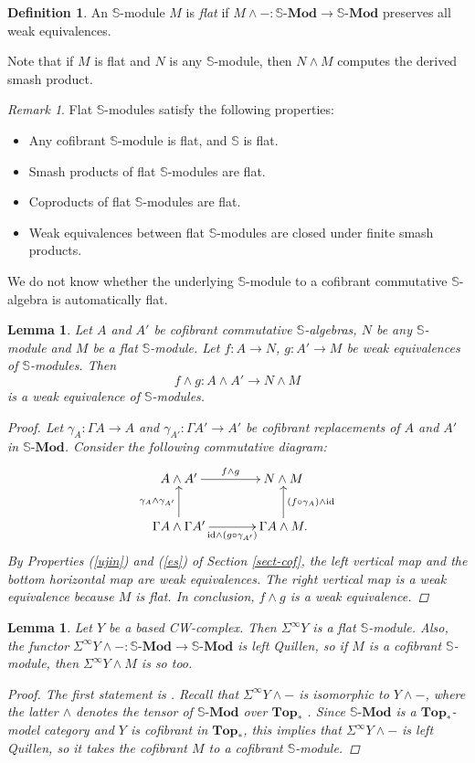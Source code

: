\documentclass[a4paper,11pt]{amsart} %
\theoremstyle{definition} \newtheorem{defn}[equation]{Definition}
\theoremstyle{remark} \newtheorem{notation}[equation]{Notation}
\theoremstyle{plain} \newtheorem{teo}[equation]{Theorem}
\theoremstyle{plain} \newtheorem{lema}[equation]{Lemma}
\theoremstyle{plain} \newtheorem{prop}[equation]{Proposition}
\theoremstyle{plain} \newtheorem{corolario}[equation]{Corollary}
\theoremstyle{remark} \newtheorem{obs}[equation]{Remark}
\theoremstyle{remark} \newtheorem{sideobs}[equation]{Side remark}
\theoremstyle{remark} \newtheorem{ejercicio}[equation]{Exercise}
\theoremstyle{definition} \newtheorem{notn}[equation]{Notation}
\theoremstyle{remark} \newtheorem{ej}[equation]{Example}
\theoremstyle{remark} \newtheorem{contraej}[equation]{Counterexample}
\theoremstyle{plain} \newtheorem{conj}[equation]{Conjecture}
\renewcommand{\1}{\ensuremath{\mathbbm{1}}}
\renewcommand{\S}{\mathbb{S}}
\newcommand{\bi}{\begin{itemize}}
\newcommand{\ei}{\end{itemize}}
\newcommand{\bdefn}{\begin{defn}}
\newcommand{\edefn}{\end{defn}}
\newcommand{\bprf}{\begin{proof}}
\newcommand{\eprf}{\end{proof}}
\newcommand{\bobs}{\begin{obs}}
\newcommand{\eobs}{\end{obs}}
\newcommand{\id}{\mathrm{id}}
\newcommand{\Mod}{\mbox{-}\mathbf{Mod}}
\newcommand{\SMod}{\ensuremath{\mathbb{S}}\mbox{-}\ensuremath{\textbf{Mod}}}
\newcommand{\Top}{\ensuremath{\mathbf{Top}}}
\numberwithin{equation}{section}
\begin{document}
%

%

%
%

\bdefn \label{def-flat}An $\S$-module $M$ is \emph{flat} if $M\wedge-:\SMod\to \SMod$ preserves all weak equivalences.
\edefn

Note that if $M$ is flat and $N$ is any $\S$-module, then $N\wedge M$ computes the derived smash product.


\bobs Flat $\S$-modules satisfy the following properties: \label{pseudo-rem} 
\bi 
\item Any cofibrant $\S$-module is flat, and $\S$ is flat.
\item Smash products of flat $\S$-modules are flat.
\item Coproducts of flat $\S$-modules are flat.
\item Weak equivalences between flat $\S$-modules are closed under finite smash products. %
%
\ei
We do not know whether the underlying $\S$-module to a cofibrant commutative $\S$-algebra is automatically flat.
\eobs

\begin{lema} \label{cofcofsemi} Let $A$ and $A'$ be cofibrant commutative $\S$-algebras, $N$ be any $\S$-module and $M$ be a flat $\S$-module. Let $f:A\to N$, $g:A'\to M$ be weak equivalences of $\S$-modules. Then 
\[f \wedge g : A \wedge A' \to N \wedge M\]
is a weak equivalence of $\S$-modules.
\bprf Let $\gamma_A:\Gamma A \to A$ and $\gamma_{A'}:\Gamma A' \to A'$ be cofibrant replacements of $A$ and $A'$ in $\SMod$. Consider the following commutative diagram:
\[\xymatrix@C+1pc{A \wedge A' \ar[r]^-{f \wedge g} & N \wedge M \\ \Gamma A \wedge \Gamma A' \ar[u]^-{\gamma_A \wedge \gamma_{A'}} \ar[r]_-{\id \wedge (g\circ \gamma_{A'})} & \Gamma A \wedge M. \ar[u]_-{(f\circ \gamma_A) \wedge \id} }\]
By Properties (\ref{ujin}) and (\ref{es}) of Section \ref{sect-cof}, the left vertical map and the bottom horizontal map are weak equivalences. The right vertical map is a weak equivalence because $M$ is flat. In conclusion, $f\wedge g$ is a weak equivalence.
\eprf
\end{lema}


\begin{lema} \label{isflat} Let $Y$ be a based CW-complex. Then $\Sigma^\infty Y$ is a flat $\S$-module. Also, the functor $\Sigma^\infty Y \wedge -:\S\Mod\to \S\Mod $ is left Quillen,  %
so if $M$ is a cofibrant $\S$-module, then $\Sigma^\infty Y \wedge M$ is so too. %
\bprf The first statement is \cite[4.11(i)]{mandell-may}. Recall that $\Sigma^\infty Y \wedge-$ is isomorphic to $Y\wedge -$, where the latter $\wedge$ denotes the tensor of $\SMod$ over $\Top_*$ \cite[II.1.4]{ekmm}. Since $\SMod$ is a $\Top_*$-model category and $Y$ is cofibrant in $\Top_*$, this implies that $\Sigma^\infty Y \wedge -$ is left Quillen, so it takes the cofibrant $M$ to a cofibrant $\S$-module. %
\eprf
\end{lema}
\end{document}
